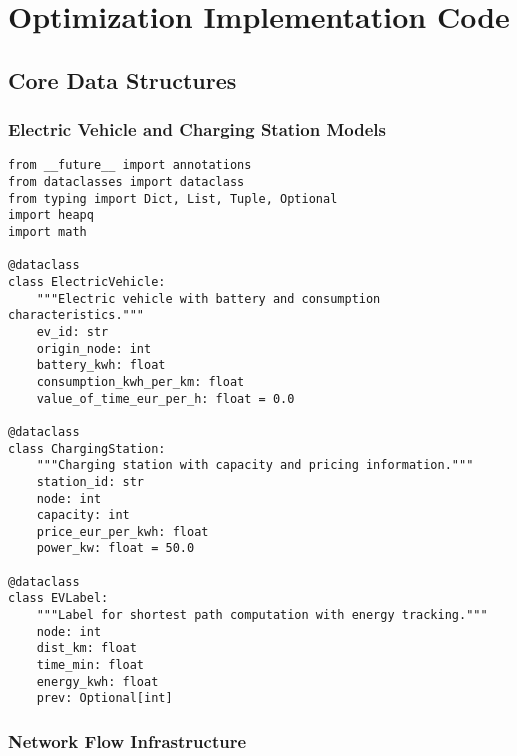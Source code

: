 \documentclass[12pt,a4paper]{article}
\begin{document}
\section{Optimization Implementation Code}

\subsection{Core Data Structures}

\subsubsection{Electric Vehicle and Charging Station Models}

\begin{lstlisting}[caption=Core Data Models]
from __future__ import annotations
from dataclasses import dataclass
from typing import Dict, List, Tuple, Optional
import heapq
import math

@dataclass
class ElectricVehicle:
    """Electric vehicle with battery and consumption characteristics."""
    ev_id: str
    origin_node: int
    battery_kwh: float
    consumption_kwh_per_km: float
    value_of_time_eur_per_h: float = 0.0

@dataclass
class ChargingStation:
    """Charging station with capacity and pricing information."""
    station_id: str
    node: int
    capacity: int
    price_eur_per_kwh: float
    power_kw: float = 50.0

@dataclass
class EVLabel:
    """Label for shortest path computation with energy tracking."""
    node: int
    dist_km: float
    time_min: float
    energy_kwh: float
    prev: Optional[int]
\end{lstlisting}

\subsubsection{Network Flow Infrastructure}
\end{document}
